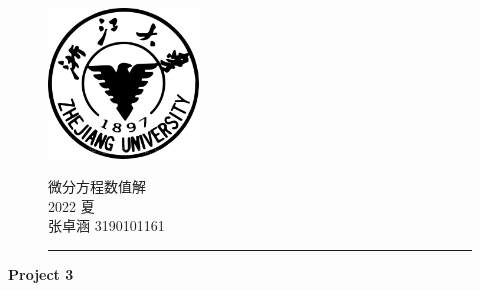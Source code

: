 \documentclass[a4paper,11.5pt,UTF8]{ctexart}
\author{张卓涵 3190101161}
\begin{document}
\begin{figure}[t]
\begin{minipage}[h]{0.25\linewidth}
	\includegraphics[width=4.0cm]{./image/ZJU2.jpeg}
\end{minipage}
\hfill
\begin{minipage}[h]{.7\linewidth}
	\begin{flushright}
			\Large{微分方程数值解
				\vspace{3mm}	\\
				   2022 夏
				\vspace{3mm}	\\
				   张卓涵 \hspace{3mm}3190101161}
	\end{flushright}
\end{minipage}
\rule{\linewidth}{0.1em}
\end{figure}
\begin{center}
	\huge{\textbf{Project 3}}
\end{center}
\end{document}
